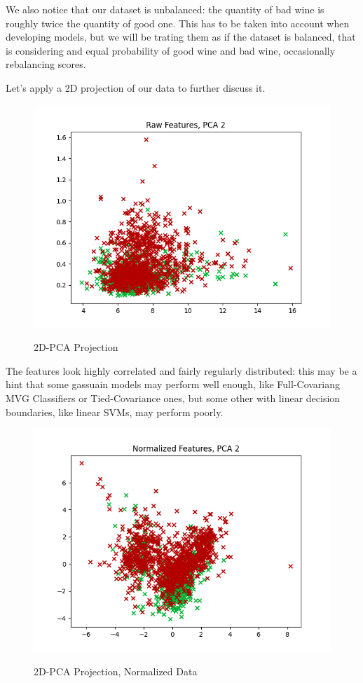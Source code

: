 \documentclass[12pt, twocolumn]{article}
\begin{document}
We also notice that our dataset is unbalanced: the quantity of bad wine is roughly twice the quantity of good one. This has to be taken into account when developing models, but we will be trating them as if the dataset is balanced, that is considering and equal probability of good wine and bad wine, occasionally rebalancing scores.

Let's apply a 2D projection of our data to further discuss it.

\begin{figure}[H]
    \caption{2D-PCA Projection}
    {\includegraphics[width=\linewidth]{2DRAW.png}}
    \label{2DRAW}
\end{figure}

The features look highly correlated and fairly regularly distributed: this may be a hint that some gassuain models may perform well enough, like Full-Covariang MVG Classifiers or Tied-Covariance ones, but some other with linear decision boundaries, like linear SVMs, may perform poorly.

\begin{figure}[H]
    \caption{2D-PCA Projection, Normalized Data}
    {\includegraphics[width=\linewidth]{2DNorm.png}}
    \label{2DNORM}
\end{figure}
\end{document}
